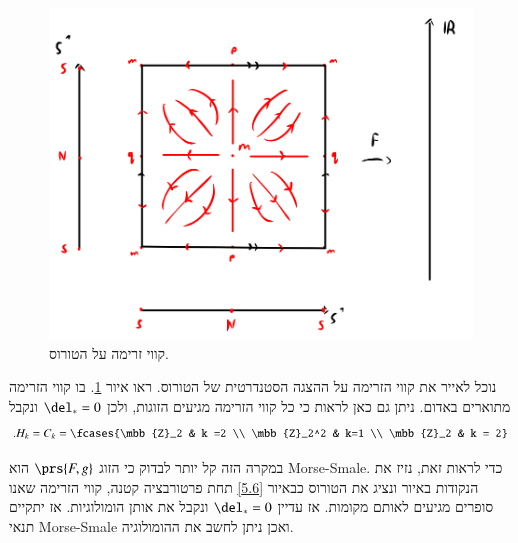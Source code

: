 \documentclass[a4paper,10pt,twoside,openany]{book}
\begin{document}
\begin{example}
\begin{figure}
\centering
\includegraphics[scale=0.5]{sources/5.5}
\caption{קווי זרימה על הטורוס.}
\label{5.5}
\end{figure}

נוכל לאייר את קווי הזרימה על ההצגה הסטנדרטית של הטורוס. ראו איור
\ref{5.5}.
בו קווי הזרימה מתוארים באדום.
ניתן גם כאן לראות כי כל קווי הזרימה מגיעים הזוגות, ולכן
$\del_* = 0$
ונקבל
\begin{align*}
\text{.} H_k = C_k = \fcases{\mbb{Z}_2 & k =2 \\ \mbb{Z}_2^2 & k=1 \\ \mbb{Z}_2 & k = 2}
\end{align*}

במקרה הזה קל יותר לבדוק כי הזוג
$\prs{F,g}$
הוא
\textenglish{Morse-Smale}.
כדי לראות זאת, נזיז את הנקודות באיור ונציג את הטורוס כבאיור
\ref{5.6}
תחת פרטורבציה קטנה, קווי הזרימה שאנו סופרים מגיעים לאותם מקומות. אז עדיין
$\del_* = 0$
ונקבל את אותן הומולוגיות.
אז יתקיים תנאי \textenglish{Morse-Smale} ואכן ניתן לחשב את ההומולוגיה.
\end{example}
\end{document}
